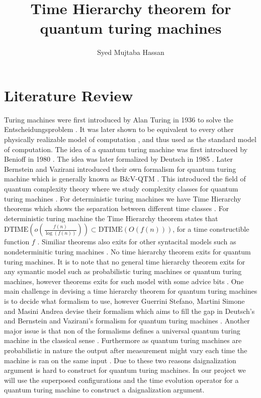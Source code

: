 \documentclass[11pt,a4paper]{article}
\title{Time Hierarchy theorem for quantum turing machines}
\author{Syed Mujtaba Hassan}
\begin{document}
\maketitle

\section*{Literature Review}
Turing machines were first introduced by Alan Turing in 1936 to solve the Entscheidungsproblem \cite{11}.
It was later shown to be equivalent to every other physically realizable model of computation \cite{13}\cite{14}\cite{10}, and thus used as the standard model of computation.
The idea of a quantum turing machine was first introduced by Benioff in 1980 \cite{15}\cite{16}. 
The idea was later formalized by Deutsch in 1985 \cite{9}. Later Bernstein and Vazirani introduced their own formalism for quantum turing machine which is generally known as B\&V-QTM \cite{5}\cite{4}\cite{8}.
This introduced the field of quantum complexity theory where we study complexity classes for quantum turing machines \cite{8}\cite{6}\cite{5}.
For deterministic turing machines we have Time Hierarchy theorems which shows the separation between different time classes \cite{6}\cite{10}.
For deterministic turing machine the Time Hierarchy theorem states that $\text{DTIME}(o(\frac{f(n)}{\log(f(n))})) \subset \text{DTIME}(O(f(n)))$, for a time constructible function $f$ \cite{6}\cite{10}. 
Similiar theorems also exits for other syntacital models such as nondeterminitic turing machines \cite{6}\cite{10}. 
No time hierarchy theorem exits for quantum turing machines. 
It is to note that no general time hierarchy theorem exits for any symantic model such as probabilistic turing machines or quantum turing machines, however theorems exits for such model with some advice bits \cite{3}.
One main challenge in devising a time hierarchy theorem for quantum turing machines is to decide what formalism to use, however Guerrini Stefano, Martini Simone and Masini Andrea devise their formalism which aims to fill the gap in Deutsch's and Bernstein and Vazirani's formalism for quantum turing machines \cite{4}.
Another major issue is that non of the formalisms defines a universal quantum turing machine in the classical sense \cite{2}. 
Furthermore as quantum turing machines are probabilistic in nature the output after measurement might vary each time the machine is ran on the same input \cite{8}. Due to these two reasons daignalization argument is hard to construct for quantum turing machines.
In our project we will use the superposed configurations and the time evolution operator for a quantum turing machine to construct a daignalization argument.
 
 
\nocite{*}%
\end{document}
